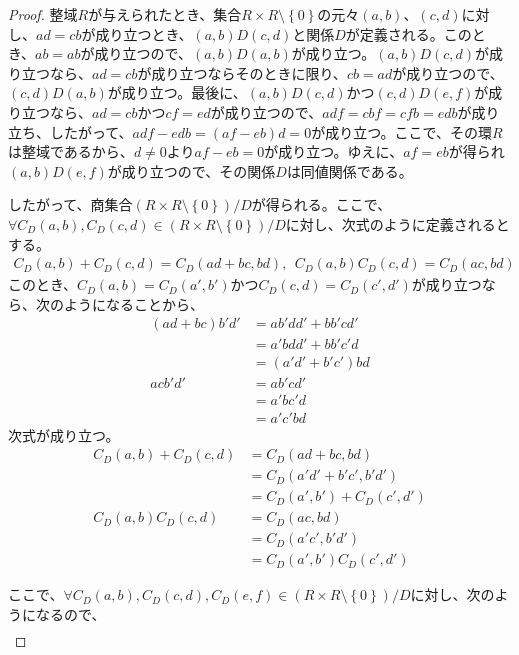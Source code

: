 \documentclass[dvipdfmx]{jsarticle}
\begin{document}
\begin{proof}
整域$R$が与えられたとき、集合$R \times R \setminus \left\{ 0 \right\}$の元々$(a,b)$、$(c,d)$に対し、$ad = cb$が成り立つとき、$(a,b)D(c,d)$と関係$D$が定義される。このとき、$ab = ab$が成り立つので、$(a,b)D(a,b)$が成り立つ。$(a,b)D(c,d)$が成り立つなら、$ad = cb$が成り立つならそのときに限り、$cb = ad$が成り立つので、$(c,d)D(a,b)$が成り立つ。最後に、$(a,b)D(c,d)$かつ$(c,d)D(e,f)$が成り立つなら、$ad = cb$かつ$cf = ed$が成り立つので、$adf = cbf = cfb = edb$が成り立ち、したがって、$adf - edb = (af - eb)d = 0$が成り立つ。ここで、その環$R$は整域であるから、$d \neq 0$より$af - eb = 0$が成り立つ。ゆえに、$af = eb$が得られ$(a,b)D(e,f)$が成り立つので、その関係$D$は同値関係である。\par
したがって、商集合${\left( R \times R \setminus \left\{ 0 \right\} \right)}/{D}$が得られる。ここで、$\forall C_{D}(a,b),C_{D}(c,d) \in {\left( R \times R \setminus \left\{ 0 \right\} \right)}/{D}$に対し、次式のように定義されるとする。
\begin{align*}
C_{D}(a,b) + C_{D}(c,d) = C_{D}(ad + bc,bd),\ \ C_{D}(a,b)C_{D}(c,d) = C_{D}(ac,bd)
\end{align*}
このとき、$C_{D}(a,b) = C_{D}\left( a',b' \right)$かつ$C_{D}(c,d) = C_{D}\left( c',d' \right)$が成り立つなら、次のようになることから、
\begin{align*}
(ad + bc)b'd' &= ab'dd' + bb'cd'\\
&= a'bdd' + bb'c'd\\
&= \left( a'd' + b'c' \right)bd\\
acb'd' &= ab'cd'\\
&= a'bc'd\\
&= a'c'bd
\end{align*}
次式が成り立つ。
\begin{align*}
C_{D}(a,b) + C_{D}(c,d) &= C_{D}(ad + bc,bd)\\
&= C_{D}\left( a'd' + b'c',b'd' \right)\\
&= C_{D}\left( a',b' \right) + C_{D}\left( c',d' \right)\\
C_{D}(a,b)C_{D}(c,d) &= C_{D}(ac,bd)\\
&= C_{D}\left( a'c',b'd' \right)\\
&= C_{D}\left( a',b' \right)C_{D}\left( c',d' \right)
\end{align*}\par
ここで、$\forall C_{D}(a,b),C_{D}(c,d),C_{D}(e,f) \in {\left( R \times R \setminus \left\{ 0 \right\} \right)}/{D}$に対し、次のようになるので、
\begin{align*}

\end{align*}
\end{proof}
\end{document}
